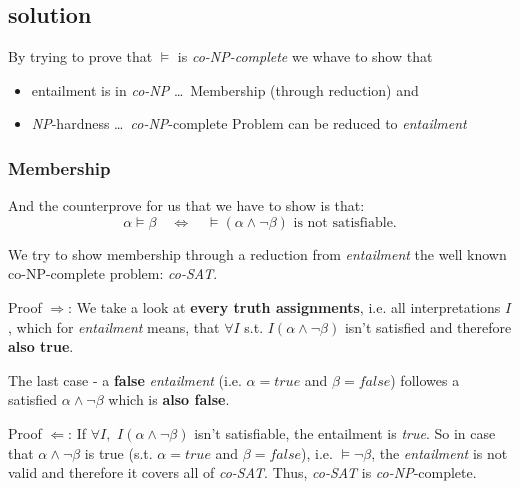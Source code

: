 \subsection{solution}

By trying to prove that $\models $ is \textit{co-NP-complete} we whave to
show that

\begin{itemize}
\item entailment is in \textit{co-NP} \dots\ Membership (through reduction)
and

\item \textit{NP}-hardness \dots\ \textit{co-NP}-complete Problem can be
reduced to \textit{entailment}
\end{itemize}

\subsubsection{Membership}

And the counterprove for us that we have to show is that:%
\begin{equation*}
\alpha \models \beta \quad \iff \quad \models (\alpha \wedge \lnot \beta )%
\text{ is not satisfiable.}
\end{equation*}

\noindent We try to show membership through a reduction from \textit{%
entailment} the well known co-NP-complete problem: \textit{co-SAT}.\newline

\noindent Proof $\Rightarrow $:\newline
We take a look at \textbf{every truth assignments}, i.e. all interpretations 
$I$, which for \textit{entailment} means, that $\forall I$ s.t. $I(\alpha
\wedge \lnot \beta )$ isn't satisfied and therefore \textbf{also true}.

The last case - a \textbf{false} \textit{entailment} (i.e. $\alpha =true$
and $\beta =false$) followes a satisfied $\alpha \wedge \lnot \beta $ which
is \textbf{also false}.

\noindent Proof $\Leftarrow $:\newline
If $\forall I,$ $I(\alpha \wedge \lnot \beta )$ isn't satisfiable, the
entailment is \textit{true}.\newline
So in case that $\alpha \wedge \lnot \beta $ is true (s.t. $\alpha =true$
and $\beta =false$), i.e. $\models \lnot \beta $, the \textit{entailment} is
not valid and therefore it covers all of \textit{co-SAT}. Thus, \textit{%
co-SAT} is \textit{co-NP}-complete. 

